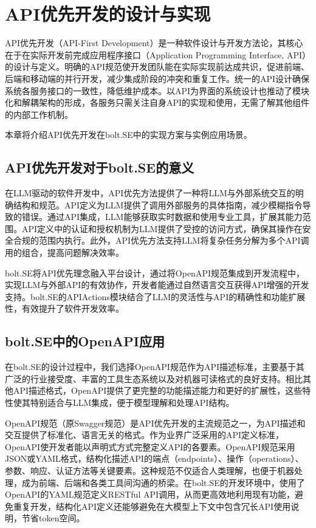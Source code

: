 
\chapter{API优先开发的设计与实现}
\label{chap:api-first}

API优先开发（API-First Development）是一种软件设计与开发方法论，其核心在于在实际开发前完成应用程序接口（Application Programming Interface, API）的设计与定义。明确的API规范使开发团队能在实际实现前达成共识，促进前端、后端和移动端的并行开发，减少集成阶段的冲突和重复工作。统一的API设计确保系统各服务接口的一致性，降低维护成本。以API为界面的系统设计也推动了模块化和解耦架构的形成，各服务只需关注自身API的实现和使用，无需了解其他组件的内部工作机制。

本章将介绍API优先开发在bolt.SE中的实现方案与实例应用场景。

\section{API优先开发对于bolt.SE的意义}

在LLM驱动的软件开发中，API优先方法提供了一种将LLM与外部系统交互的明确结构和规范。API定义为LLM提供了调用外部服务的具体指南，减少模糊指令导致的错误。通过API集成，LLM能够获取实时数据和使用专业工具，扩展其能力范围。API定义中的认证和授权机制为LLM提供了受控的访问方式，确保其操作在安全合规的范围内执行。此外，API优先方法支持LLM将复杂任务分解为多个API调用的组合，提高问题解决效率。

bolt.SE将API优先理念融入平台设计，通过将OpenAPI规范集成到开发流程中，实现LLM与外部API的有效协作，开发者能通过自然语言交互获得API增强的开发支持。bolt.SE的APIActions模块结合了LLM的灵活性与API的精确性和功能扩展性，有效提升了软件开发效率。

\section{bolt.SE中的OpenAPI应用}

在bolt.SE的设计过程中，我们选择OpenAPI规范作为API描述标准，主要基于其广泛的行业接受度、丰富的工具生态系统以及对机器可读格式的良好支持。相比其他API描述格式，OpenAPI提供了更完整的功能描述能力和更好的扩展性，这些特性使其特别适合与LLM集成，便于模型理解和处理API结构。

OpenAPI规范（原Swagger规范）是API优先开发的主流规范之一，为API描述和交互提供了标准化、语言无关的格式\cite{openapi2023}。作为业界广泛采用的API定义标准，OpenAPI使开发者能以声明式方式完整定义API的各要素。OpenAPI规范采用JSON或YAML格式，结构化描述API的端点（endpoints）、操作（operations）、参数、响应、认证方法等关键要素。这种规范不仅适合人类理解，也便于机器处理，成为前端、后端和各类工具间沟通的桥梁。在bolt.SE的开发环境中，使用了OpenAPI的YAML规范定义RESTful API调用，从而更高效地利用现有功能，避免重复开发，结构化API定义还能够避免在大模型上下文中包含冗长API使用说明，节省token空间。

